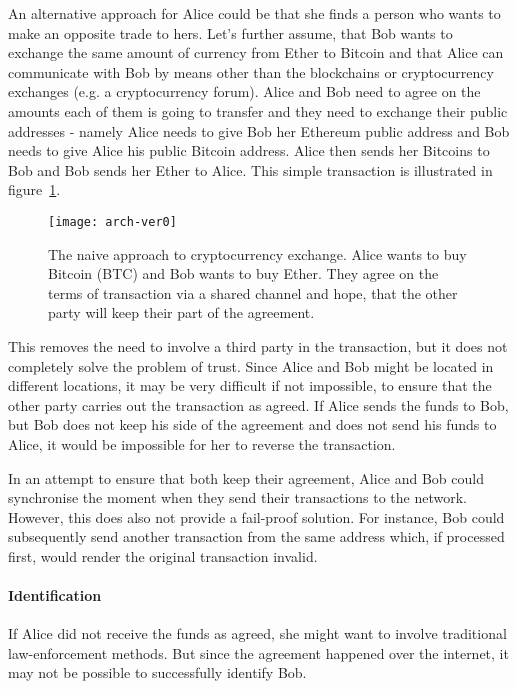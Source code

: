 An alternative approach for Alice could be that she finds a person who wants to make an opposite trade to hers. Let's further assume, that Bob wants to exchange the same amount of currency from Ether to Bitcoin and that Alice can communicate with Bob by means other than the blockchains or cryptocurrency exchanges (e.g. a cryptocurrency forum). Alice and Bob need to agree on the amounts each of them is going to transfer and they need to exchange their public addresses - namely Alice needs to give Bob her Ethereum public address and Bob needs to give Alice his public Bitcoin address. Alice then sends her Bitcoins to Bob and Bob sends her Ether to Alice. This simple transaction is illustrated in figure~\ref{fig:arch-ver0}.

\begin{figure}[ht]
    \centering
    \texttt{[image: arch-ver0]}
    \caption{The naive approach to cryptocurrency exchange. Alice wants to buy Bitcoin (BTC) and Bob wants to buy Ether. They agree on the terms of transaction via a shared channel and hope, that the other party will keep their part of the agreement.}
    \label{fig:arch-ver0}
\end{figure}

This removes the need to involve a third party in the transaction, but it does not completely solve the problem of trust. Since Alice and Bob might be located in different locations, it may be very difficult if not impossible, to ensure that the other party carries out the transaction as agreed. If Alice sends the funds to Bob, but Bob does not keep his side of the agreement and does not send his funds to Alice, it would be impossible for her to reverse the transaction. 

In an attempt to ensure that both keep their agreement, Alice and Bob could synchronise the moment when they send their transactions to the network. However, this does also not provide a fail-proof solution. For instance, Bob could subsequently send another transaction from the same address which, if processed first, would render the original transaction invalid.

\paragraph{Identification} 
If Alice did not receive the funds as agreed, she might want to involve traditional law-enforcement methods. But since the agreement happened over the internet, it may not be possible to successfully identify Bob.


